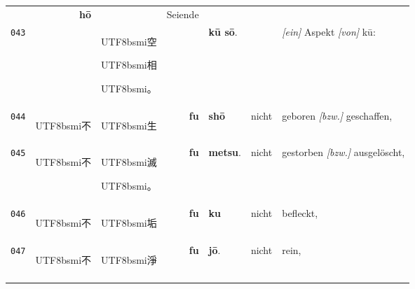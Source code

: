 \documentclass[
DIV=calc,
BCOR=5mm,
11pt,
headings=small,
oneside,
bibtotocnumbered,
english,ngerman]{scrartcl}
\newcommand{\cnbsmi}[1]{\begin{CJK}{UTF8}{bsmi}#1\end{CJK}}
\begin{document}
\begin{center}
\begin{tabular}{r|rl|rl|rl}
  ~ & \textbf{hō} &
  ~ & \textrm{Seiende} \\
{\tiny\texttt{043}}&
  ~ & \cnbsmi{空} \cnbsmi{相} \cnbsmi{。} &
  ~ & \textbf{kū sō}. &
  ~ & \textrm{\emph{[ein]} Aspekt \emph{[von]} kū}: \\
\hdashline
{\tiny\texttt{044}}&
  \cnbsmi{不} & \cnbsmi{生} &
  \textbf{fu} & \textbf{shō} & 
  \textrm{nicht} & \textrm{geboren \emph{[bzw.]} geschaffen}, \\
{\tiny\texttt{045}}&
  \cnbsmi{不} & \cnbsmi{滅} \cnbsmi{。} &
  \textbf{fu} & \textbf{metsu}. &
  \textrm{nicht} & \textrm{gestorben \emph{[bzw.]} ausgelöscht},\\
\hdashline
{\tiny\texttt{046}}&
  \cnbsmi{不} & \cnbsmi{垢} &
  \textbf{fu} & \textbf{ku} &
  \textrm{nicht} & \textrm{befleckt}, \\
{\tiny\texttt{047}}&
  \cnbsmi{不} & \cnbsmi{淨} &
  \textbf{fu} & \textbf{jō}. &
  \textrm{nicht} & \textrm{rein}, \\
\hdashline
\end{tabular}


\end{center}
\end{document}
